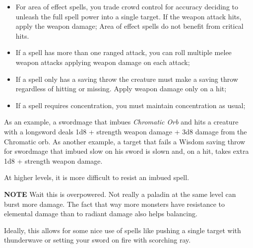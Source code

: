 \begin{multicols*}{2}
\begin{itemize}
    \item For area of effect spells, you trade crowd control for accuracy deciding to unleash the full spell power into a single target. If the weapon attack hits, apply the weapon damage; Area of effect spells do not benefit from critical hits.
    \item If a spell has more than one ranged attack, you can roll multiple melee weapon attacks applying weapon damage on each attack;
    \item If a spell only has a saving throw the creature must make a saving throw regardless of hitting or missing. Apply weapon damage only on a hit;
    \item If a spell requires concentration, you must maintain concentration as usual;
\end{itemize}



As an example, a swordmage that imbues \textit{Chromatic Orb} and hits a creature with 
a longsword deals 1d8 + strength weapon damage + 3d8 damage from the Chromatic orb. 
As another example, a target that fails a Wisdom saving throw for swordmage that imbued slow on his sword 
is slown and, on a hit, takes extra 1d8 + strength weapon damage.




At higher levels, it is more difficult to resist an imbued spell.

\smallskip

{\color{red} \textbf{NOTE} Wait this is overpowered. Not really a paladin at the same level can burst more damage. The fact that way more monsters
have resistance to elemental damage than to radiant damage also helps balancing.

Ideally, this allows for some nice use of spells like pushing a single target with thunderwave or setting your sword on fire with scorching ray. 
}




\end{multicols*}
